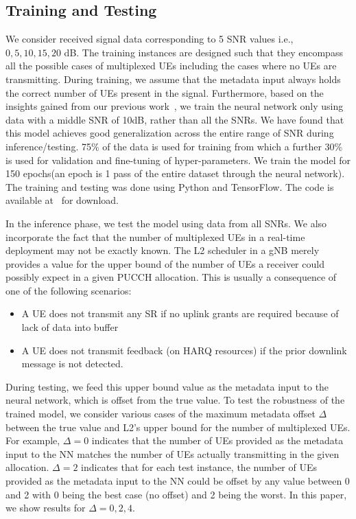 \documentclass[journal]{IEEEtran}
\begin{document}
\subsection{Training and Testing}
We consider received signal data corresponding to 5 SNR values i.e., $0, 5, 10, 15, 20$ dB. The training instances are designed such that they encompass all the possible cases of multiplexed UEs including the cases where no UEs are transmitting. During training, we assume that the metadata input always holds the correct number of UEs present in the signal. Furthermore, based on the insights gained from our previous work~\cite{yerrapragada2023machine}, we train the neural network only using data with a middle SNR of 10dB, rather than all the SNRs. We have found that this model achieves good generalization across the entire range of SNR during inference/testing. 75\% of the data is used for training from which a further 30\% is used for validation and fine-tuning of hyper-parameters. We train the model for 150 epochs(an epoch is 1 pass of the entire dataset through the neural network). The training and testing was done using Python and TensorFlow. The code is available at~\cite{aiml_pucch_dataset} for download.

In the inference phase, we test the model using data from all SNRs. We also incorporate the fact that the number of multiplexed UEs in a real-time deployment may not be exactly known. The L2 scheduler in a gNB merely provides a value for the upper bound of the number of UEs a receiver could possibly expect in a given PUCCH allocation. This is usually a consequence of one of the following scenarios:
\begin{itemize}
\item  A UE does not transmit any SR if no uplink grants are required because of lack of data into buffer
\item A UE does not transmit feedback (on HARQ resources) if the prior downlink message is not detected. 
\end{itemize}
During testing, we feed this upper bound value as the metadata input to the neural network, which is offset from the true value. To test the robustness of the trained model, we consider various cases of the maximum metadata offset $\Delta$ between the true value and L2's upper bound for the number of multiplexed UEs. For example, $\Delta = 0$ indicates that the number of UEs provided as the metadata input to the NN matches the number of UEs actually transmitting in the given allocation. $\Delta = 2$ indicates that for each test instance, the number of UEs provided as the metadata input to the NN could be offset by any value between 0 and 2 with 0 being the best case (no offset) and 2 being the worst. In this paper, we show results for $\Delta = 0, 2, 4$.
\end{document}
